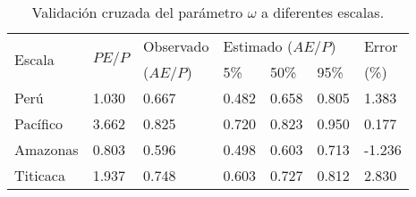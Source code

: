 \begin{table}[htb]
\caption{Validación cruzada del parámetro $\omega$ a diferentes escalas.}
\label{tab:Table_pbias}
\centering
\begin{tabular}{lllllll}
\hline
\multirow{2}{*}{Escala} & \multirow{2}{*}{$PE/P$} & Observado & \multicolumn{3}{l}{Estimado ($AE/P$)} & Error  \\
                        &                       & ($AE/P$)    & 5\%        & 50\%       & 95\%      & (\%)   \\ \hline
Perú                    & 1.030                 & 0.667     & 0.482      & 0.658      & 0.805     & 1.383  \\
Pacífico                & 3.662                 & 0.825     & 0.720      & 0.823      & 0.950     & 0.177  \\
Amazonas                & 0.803                 & 0.596     & 0.498      & 0.603      & 0.713     & -1.236 \\
Titicaca                & 1.937                 & 0.748     & 0.603      & 0.727      & 0.812     & 2.830  \\ \hline
\end{tabular}
\end{table}